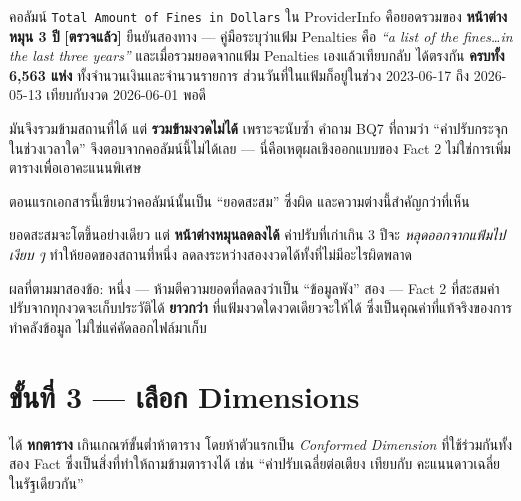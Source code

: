 \documentclass[11pt,a4paper]{article}
\newcommand{\code}[1]{\texttt{#1}}
\newcommand{\ok}{\textcolor{dw}{\textbf{[ตรวจแล้ว]}}}
\begin{document}
\begin{warnbox}[title={ProviderInfo มีคอลัมน์ค่าปรับอยู่แล้ว แต่ใช้แทน Fact 2 ไม่ได้}]
คอลัมน์ \code{Total Amount of Fines in Dollars} ใน ProviderInfo คือยอดรวมของ
\textbf{หน้าต่างหมุน 3 ปี} \ok{} ยืนยันสองทาง --- คู่มือระบุว่าแฟ้ม Penalties คือ
\emph{``a list of the fines\ldots in the last three years''} และเมื่อรวมยอดจากแฟ้ม
Penalties เองแล้วเทียบกลับ ได้ตรงกัน \textbf{ครบทั้ง 6{,}563 แห่ง}
ทั้งจำนวนเงินและจำนวนรายการ ส่วนวันที่ในแฟ้มก็อยู่ในช่วง
2023-06-17 ถึง 2026-05-13 เทียบกับงวด 2026-06-01 พอดี

\vspace{0.3em}
มันจึงรวมข้ามสถานที่ได้ แต่ \textbf{รวมข้ามงวดไม่ได้} เพราะจะนับซ้ำ
คำถาม BQ7 ที่ถามว่า ``ค่าปรับกระจุกในช่วงเวลาใด'' จึงตอบจากคอลัมน์นี้ไม่ได้เลย
--- นี่คือเหตุผลเชิงออกแบบของ Fact 2 ไม่ใช่การเพิ่มตารางเพื่อเอาคะแนนพิเศษ
\end{warnbox}

\begin{badbox}[title={หน้าต่างหมุนอันตรายกว่ายอดสะสม --- ค่าปรับ ``หายไป'' ได้เอง}]
ตอนแรกเอกสารนี้เขียนว่าคอลัมน์นั้นเป็น ``ยอดสะสม'' ซึ่งผิด
และความต่างนี้สำคัญกว่าที่เห็น

\vspace{0.3em}
ยอดสะสมจะโตขึ้นอย่างเดียว แต่ \textbf{หน้าต่างหมุนลดลงได้}
ค่าปรับที่เก่าเกิน 3 ปีจะ \emph{หลุดออกจากแฟ้มไปเงียบ ๆ} ทำให้ยอดของสถานที่หนึ่ง
ลดลงระหว่างสองงวดได้ทั้งที่ไม่มีอะไรผิดพลาด

\vspace{0.3em}
ผลที่ตามมาสองข้อ: หนึ่ง --- ห้ามตีความยอดที่ลดลงว่าเป็น ``ข้อมูลพัง''
สอง --- Fact 2 ที่สะสมค่าปรับจากทุกงวดจะเก็บประวัติได้ \textbf{ยาวกว่า}
ที่แฟ้มงวดใดงวดเดียวจะให้ได้ ซึ่งเป็นคุณค่าที่แท้จริงของการทำคลังข้อมูล
ไม่ใช่แค่คัดลอกไฟล์มาเก็บ
\end{badbox}

\section{ขั้นที่ 3 --- เลือก Dimensions}

ได้ \textbf{หกตาราง} เกินเกณฑ์ขั้นต่ำห้าตาราง โดยห้าตัวแรกเป็น \emph{Conformed Dimension}
ที่ใช้ร่วมกันทั้งสอง Fact ซึ่งเป็นสิ่งที่ทำให้ถามข้ามตารางได้ เช่น
``ค่าปรับเฉลี่ยต่อเตียง เทียบกับ คะแนนดาวเฉลี่ย ในรัฐเดียวกัน''
\end{document}
